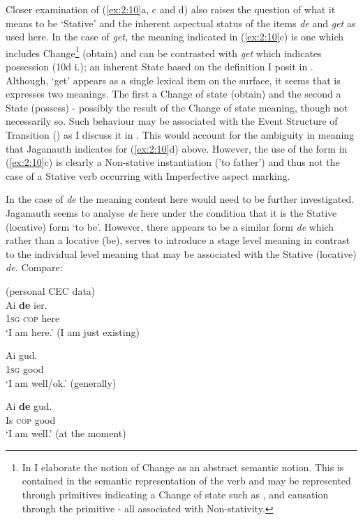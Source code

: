 Closer examination of (\ref{ex:2:10}a, c and d) also raises the
question of what it means to be `Stative' and the inherent aspectual
status of the items \textit{de} and \textit{get} as used here.  In the
case of \textit{get,} the meaning indicated in (\ref{ex:2:10}c) is one
which includes Change\footnote{In  I elaborate the notion
  of Change as an abstract semantic notion. This is contained in the
  semantic representation of the verb and may be represented through
  primitives indicating a Change of state such as \BECOME, and
  causation through the primitive \CAUSE- all associated with
  Non-stativity.}  (obtain) and can be contrasted with \textit{get}
which indicates possession (10d i.); an inherent State based on the
definition I posit in .  Although, `get' appears as a
single lexical item on the surface, it seems that is expresses two
meanings.  The first a Change of state (obtain) and the second a State
(possess) - possibly the result of the Change of state meaning, though
not necessarily so.  Such behaviour may be associated with the Event
Structure of Transition (\citealt{Pustejovsky1988,Pustejovsky1991}) as I discuss
it in .  This would account for the ambiguity in meaning
that Jaganauth indicates for (\ref{ex:2:10}d) above.  However, the use
of the form in (\ref{ex:2:10}c) is clearly a Non-stative instantiation
('to father') and thus not the case of a Stative verb occurring with
Imperfective aspect marking.

In the case of \textit{de} the meaning content here would need to be
further investigated.  Jaganauth seems to analyse \textit{de} here
under the condition that it is the Stative (locative) form `to be'.
However, there appears to be a similar form \textit{de} which rather
than a locative (be), serves to introduce a stage level meaning in
contrast to the individual level meaning that may be associated with
the Stative (locative) \textit{de.} Compare:

\ea%
\label{ex:2:11}
(personal CEC data)\\

\ea
\gll  Ai \textbf{de} ier.\\
\textsc{1sg} \textsc{cop} here\\
\glt `I am here.' (I am just existing)

\ex  Ai  gud.\\
\textsc{1sg}  good\\
\glt `I am well/ok.' (generally)

\ex
\gll  Ai \textbf{de} gud.\\
Is \textsc{cop} good\\
\glt `I am well.' (at the moment)
\z \z

